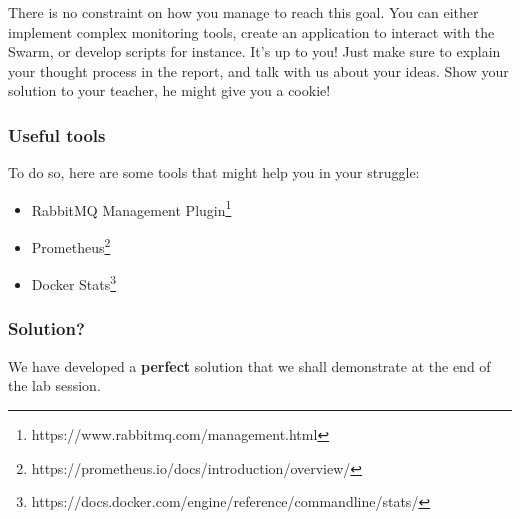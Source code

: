 \documentclass[a4paper,11pt]{exam}
\begin{document}
There is no constraint on how you manage to reach this goal.
You can either implement complex monitoring tools, create an application to interact with the Swarm, or develop scripts for instance.
It's up to you!
Just make sure to explain your thought process in the report, and talk with us about your ideas.
Show your solution to your teacher, he might give you a cookie!

\subsubsection{Useful tools}

To do so, here are some tools that might help you in your struggle:

\begin{itemize}

\item RabbitMQ Management Plugin\footnote{https://www.rabbitmq.com/management.html}

\item Prometheus\footnote{https://prometheus.io/docs/introduction/overview/}

\item Docker Stats\footnote{https://docs.docker.com/engine/reference/commandline/stats/}

\end{itemize}

\subsubsection{Solution?}

We have developed a \textbf{perfect} solution that we shall demonstrate at the end of the lab session.
\end{document}
